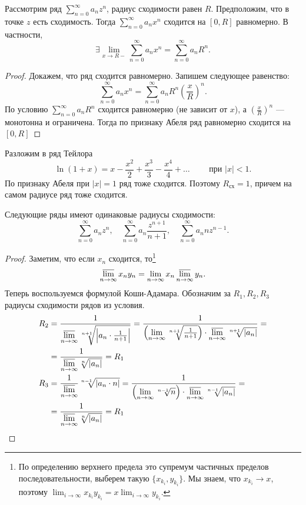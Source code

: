 \begin{thm}
	Рассмотрим ряд $ \sum_{n=0}^{\infty} a_n z^{n}$,  радиус сходимости равен $ R$. Предположим, что в точке $ z$ есть сходимость. Тогда  $ \sum_{n=0}^{\infty} a_n x^{n}$ сходится на $ [0, R]$ равномерно.
	В частности,
	\[
	\exists \lim_{x \to  R-} \sum_{n=0}^{\infty} a_n x^{n} = \sum_{n=0}^{\infty} a_n R^{n}
	.\] 
\end{thm}
\begin{proof}
    Докажем, что ряд сходится равномерно. Запишем следующее равенство:
	\[
		\sum_{n=0}^{\infty} a_n x^{n} = \sum_{n=0}^{\infty} a_{n}R^{n} \left( \frac{x}{R} \right) ^{n}
	.\] 
	По условию $ \sum_{n=0}^{\infty} a_{n}R^{n}$ сходится равномерно (не зависит от $ x$), а $ \left( \frac{x}{R} \right) ^{n}$ --- монотонна и ограничена. Тогда по признаку Абеля ряд равномерно сходится на $ [0, R]$
\end{proof}
\begin{ex}
    Разложим в ряд Тейлора
	\[
		\ln (1 + x) = x - \frac{x^2}{2} + \frac{x^3}{3} - \frac{x^{4}}{4} + \ldots \qquad \text{ при } \lvert x \rvert < 1
	.\] 
	По признаку Абеля при $ \lvert x \rvert = 1$ ряд тоже сходится. Поэтому $ R_{\text{сх}} = 1$, причем на самом радиусе ряд тоже сходится.
\end{ex}
\begin{lm}
    Следующие ряды имеют одинаковые радиусы сходимости:
	\[
		\sum_{n=0}^{\infty} a_{n}z^{n}, \quad \sum_{n=0}^{\infty} a_n \frac{z^{n+1}}{n+1}, \quad \sum_{n=0}^{\infty} a_{n} n z^{n-1}
	.\] 
\end{lm}
\begin{proof}
	Заметим, что если $ x_{n}$ сходится, то\footnote{По определению верхнего предела это супремум частичных пределов последовательности, выберем такую $ \{x_{k_{i}}, y_{k_{i}}\}$. Мы знаем, что $ x_{k_{i}} \to x $, поэтому $ \lim_{i \to \infty} x_{k_{i}} y_{k _{i}} = x \lim_{i \to \infty} y_{k_i}$. }\[
    \varlimsup_{n \to  \infty} x_{n} y_{n} = \lim_{n \to \infty} x_{n} \varlimsup_{n \to \infty}y_{n}
    .\] 
	Теперь воспользуемся формулой Коши-Адамара. Обозначим за $ R_1, R_2, R_3$ радиусы сходимости рядов из условия.
	\[
	\begin{aligned}
		R_2 &= \frac{1}{\varlimsup\limits_{n \to \infty} 
				\sqrt[n+1]{\left| a_n \cdot \frac{1}{n+1} \right|} }
				= \frac{1}{\left( \lim\limits_{n\to \infty} \sqrt[n+1]{\frac{1}{n+1}}\right) \cdot \varlimsup\limits_{n\to \infty} \sqrt[n+1]{\lvert a_n \rvert }} =\\ 
			& = \frac{1}{ \varlimsup\limits_{n\to \infty} \sqrt[n]{\lvert a_{n} \rvert }} = R_1 \\
		R_3 & = \frac{1}{\varlimsup\limits_{n\to \infty}} \sqrt[n-1]{\left|a_n\cdot n\right|} 
				=\frac{1}{\left(\lim\limits_{n\to \infty} \sqrt[n-1]{n}\right)\cdot \varlimsup\limits_{n\to \infty} \sqrt[n-1]{\lvert a_n \rvert }} =\\
			& = \frac{1}{ \varlimsup\limits_{n\to \infty} \sqrt[n]{\lvert a_n \rvert }} = R_1
	\end{aligned}
	\]
\end{proof}
